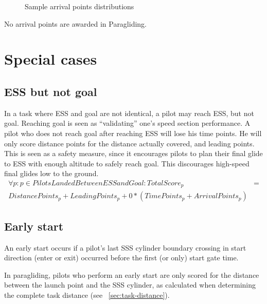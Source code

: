 \documentclass{article}
\begin{document}
\begin{figure}[h]
    \centering
    
    \caption{Sample arrival points distributions}
\end{figure}

\begin{pg}
No arrival points are awarded in Paragliding.
\end{pg}

\newpage
\section{Special cases}
\label{sec:special-cases}
\subsection{ESS but not goal}
In a task where ESS and goal are not identical, a pilot may reach ESS, but not
goal.  Reaching goal is seen as “validating” one’s speed section performance.
A pilot who does not reach goal after reaching ESS will lose his time points.
He will only score distance points for the distance actually covered, and
leading points. This is seen as a safety measure, since it encourages pilots to
plan their final glide to ESS with enough altitude to safely reach goal. This
discourages high-speed final glides low to the ground.
\begin{align*}
    \forall p : p \in PilotsLandedBetweenESSandGoal : TotalScore_p &= \\
    DistancePoints_p + LeadingPoints_p + 0 * (TimePoints_p + ArrivalPoints_p)
\end{align*}

\subsection{Early start}
\label{sec:early-start}
An early start occurs if a pilot’s last SSS cylinder boundary crossing in start
direction (enter or exit) occurred before the first (or only) start gate time.

\begin{pg}
In paragliding, pilots who perform an early start are only scored for the
distance between the launch point and the SSS cylinder, as calculated when
determining the complete task distance (see ~\ref{sec:task-distance}).
\end{pg}
\end{document}
